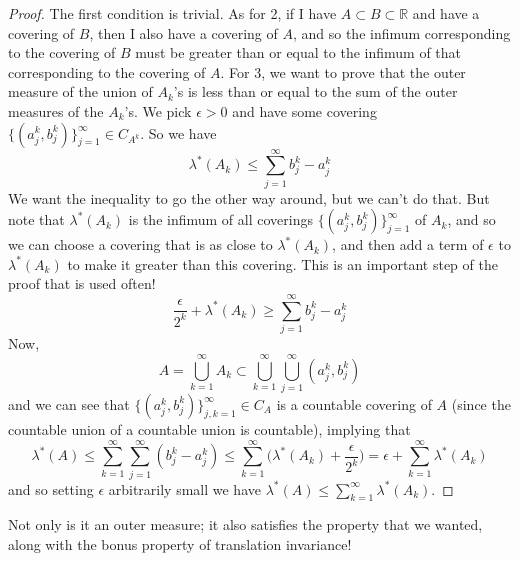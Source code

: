\begin{proof}
    The first condition is trivial. As for 2, if I have $A \subset B \subset \mathbb{R}$ and have a covering of $B$, then I also have a covering of $A$, and so the infimum corresponding to the covering of $B$ must be greater than or equal to the infimum of that corresponding to the covering of $A$. For 3, we want to prove that the outer measure of the union of $A_k$'s is less than or equal to the sum of the outer measures of the $A_k$'s. We pick $\epsilon > 0$ and have some covering $\{(a^k_j, b^k_j)\}_{j=1}^\infty \in C_{A^k}$. So we have 
    \begin{equation}
      \lambda^*(A_k) \leq \sum_{j=1}^\infty b^k_j - a^k_j
    \end{equation}
    We want the inequality to go the other way around, but we can't do that. But note that $\lambda^* (A_k)$ is the infimum of all coverings $\{(a^k_j, b^k_j)\}_{j=1}^\infty$ of $A_k$, and so we can choose a covering that is as close to $\lambda^* (A_k)$, and then add a term of $\epsilon$ to $\lambda^*(A_k)$ to make it greater than this covering. This is an important step of the proof that is used often! 
    \begin{equation}
      \frac{\epsilon}{2^k} + \lambda^* (A_k) \geq \sum_{j=1}^\infty b_j^k - a_j^k 
    \end{equation}
    Now, 
    \begin{equation}
      A = \bigcup_{k=1}^\infty A_k \subset \bigcup_{k=1}^\infty \bigcup_{j=1}^\infty (a_j^k, b_j^k)
    \end{equation}
    and we can see that $\{(a_j^k , b_j^k)\}_{j, k=1}^\infty \in C_A$ is a countable covering of $A$ (since the countable union of a countable union is countable), implying that 
    \begin{equation}
      \lambda^* (A) \leq \sum_{k=1}^\infty \sum_{j=1}^\infty (b_j^k - a_j^k) \leq \sum_{k=1}^\infty \bigg( \lambda^* (A_k) + \frac{\epsilon}{2^k} \bigg) = \epsilon + \sum_{k=1}^\infty \lambda^*(A_k)
    \end{equation}
    and so setting $\epsilon$ arbitrarily small we have $\lambda^* (A) \leq \sum_{k=1}^\infty \lambda^* (A_k)$. 
  \end{proof}

  Not only is it an outer measure; it also satisfies the property that we wanted, along with the bonus property of translation invariance! 

